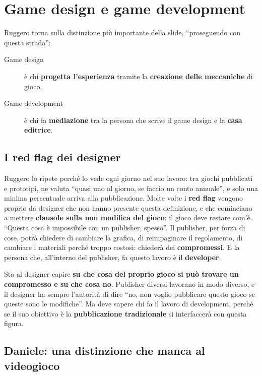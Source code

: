 \section{Game design e game development}
\label{a1:sec:design-development}

Ruggero torna sulla distinzione più importante della slide, ``proseguendo con
questa strada'':
\begin{description}
  \item[Game design] è chi \textbf{progetta l'esperienza} tramite la
        \textbf{creazione delle meccaniche} di gioco.
  \item[Game development] è chi fa \textbf{mediazione} tra la persona che scrive
        il game design e la \textbf{casa editrice}.
\end{description}

\subsection{I red flag dei designer}

Ruggero lo ripete perché lo vede ogni giorno nel suo lavoro: tra giochi
pubblicati e prototipi, ne valuta ``quasi uno al giorno, se faccio un conto
annuale'', e solo una minima percentuale arriva alla pubblicazione. Molte volte
i \textbf{red flag} vengono proprio da designer che non hanno presente questa
definizione, e che cominciano a mettere \textbf{clausole sulla non modifica del
gioco}: il gioco deve restare com'è. ``Questa cosa è impossibile con un
publisher, spesso''. Il publisher, per forza di cose, potrà chiedere di cambiare
la grafica, di reimpaginare il regolamento, di cambiare i materiali perché
troppo costosi: chiederà dei \textbf{compromessi}. E la persona che, all'interno
del publisher, fa questo lavoro è il \textbf{developer}.

Sta al designer capire \textbf{su che cosa del proprio gioco si può trovare un
compromesso e su che cosa no}. Publisher diversi lavorano in modo diverso, e il
designer ha sempre l'autorità di dire ``no, non voglio pubblicare questo gioco
se queste sono le modifiche''. Ma deve sapere chi fa il lavoro di development,
perché se il suo obiettivo è la \textbf{pubblicazione tradizionale} si
interfaccerà con questa figura.

\subsection{Daniele: una distinzione che manca al videogioco}

